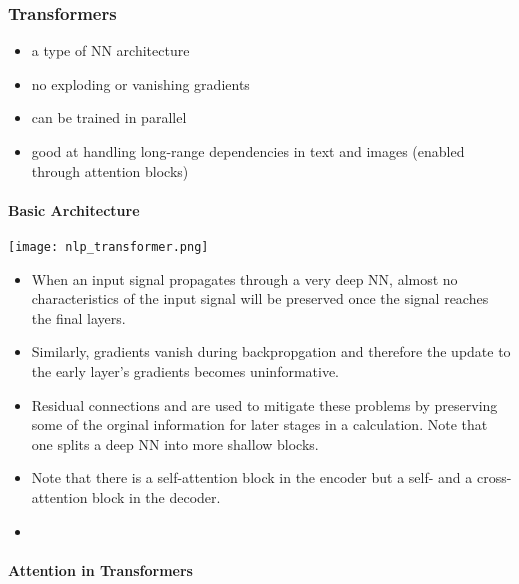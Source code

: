 \subsubsection{Transformers}
\newpar{}
\begin{itemize}
    \item a type of NN architecture
    \item no exploding or vanishing gradients
    \item can be trained in parallel
    \item good at handling long-range dependencies in text and images (enabled through attention blocks)
\end{itemize}
\paragraph{Basic Architecture}
\begin{center}
    \texttt{[image: nlp\_transformer.png]}
\end{center}

\newpar{}
\begin{itemize}
    \item When an input signal propagates through a very deep NN, almost no characteristics of the input signal will be preserved once the signal reaches the final layers.
    \item Similarly, gradients vanish during backpropgation and therefore the update to the early layer's gradients becomes uninformative.
    \item Residual connections and are used to mitigate these problems by preserving some of the orginal information for later stages in a calculation. Note that one splits a deep NN into more shallow blocks.
\end{itemize}

\newpar{}
\begin{itemize}
    \item Note that there is a self-attention block in the encoder but a self- and a cross-attention block in the decoder.
    \item %
\end{itemize}

\paragraph{Attention in Transformers}
\newpar{}

